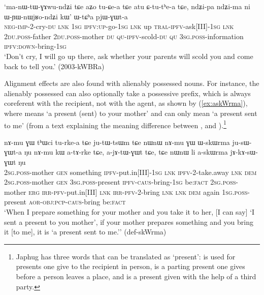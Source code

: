 \begin{exe}
\ex \label{ex:WtCha.pjWGWta}
\gll `ma-nɯ-tɯ-ɣɤwu-ndʑi tɕe aʑo tu-ɕe-a tɕe atu ɕ-tu-tʰe-a tɕe,
ndʑi-pa ndʑi-ma ni ɯ-ɲɯ-nɯjʁo-ndʑi kɯ' ɯ-tɕʰa pjɯ-ɣɯt-a \\
\textsc{neg}-\textsc{imp}-2-cry-\textsc{du} \textsc{lnk} \textsc{1sg} \textsc{ipfv}:\textsc{up}-go-\textsc{1sg} \textsc{lnk} up \textsc{tral}-\textsc{ipfv}-ask[III]-\textsc{1sg} \textsc{lnk} \textsc{2du}.\textsc{poss}-father \textsc{2du}.\textsc{poss}-mother \textsc{du} \textsc{qu}-\textsc{ipfv}-scold-\textsc{du} \textsc{qu} \textsc{3sg}.\textsc{poss}-information \textsc{ipfv}:\textsc{down}-bring-\textsc{1sg} \\
\glt `Don't cry, I will go up there, ask whether your parents will scold you and come back to tell you.' (2003-kWBRa)
\end{exe}

Alignment effects are also found with alienably possessed nouns. For instance, the alienably possessed  can also optionally take a possessive prefix, which is always coreferent with the recipient, not with the agent, as shown by (\ref{ex:askWrma}), where  means `a present (sent) to your mother' and  can only mean `a present sent to me' (from a text explaining the meaning difference between ,  and ).\footnote{Japhug has three words that can be translated as `present':  is used for presents one give to the recipient in person,  is a parting present one gives before a person leaves a place, and  is a present given with the help of a third party.}

\begin{exe}
\ex \label{ex:askWrma}
\gll nɤ-mu ɣɯ tʰɯci tu-rke-a tɕe ju-tɯ-tsɯm tɕe nɯnɯ nɤ-mu ɣɯ ɯ-skɯrma ju-sɯ-ɣɯt-a ŋu nɤ-mu kɯ a-tɤ-rke tɕe, a-jɤ-tɯ-ɣɯt tɕe, tɕe nɯnɯ li a-skɯrma jɤ-kɤ-sɯ-ɣɯt ŋu \\
\textsc{2sg}.\textsc{poss}-mother \textsc{gen} something \textsc{ipfv}-put.in[III]-\textsc{1sg} \textsc{lnk} \textsc{ipfv}-2-take.away \textsc{lnk} \textsc{dem} \textsc{2sg}.\textsc{poss}-mother \textsc{gen} \textsc{3sg}.\textsc{poss}-present \textsc{ipfv}-\textsc{caus}-bring-\textsc{1sg} be:\textsc{fact} \textsc{2sg}.\textsc{poss}-mother \textsc{erg} \textsc{irr}-\textsc{pfv}-put.in[III] \textsc{lnk} \textsc{irr}-\textsc{pfv}-2-bring \textsc{lnk} \textsc{lnk} \textsc{dem} again \textsc{1sg}.\textsc{poss}-present \textsc{aor}-\textsc{obj}:\textsc{pcp}-\textsc{caus}-bring be:\textsc{fact} \\
\glt `When I prepare something for your mother and you take it to her, [I can say] `I sent a present to you mother', if your mother prepares something and you bring it [to me], it is `a present sent to me.'' (def-skWrma)
\end{exe}

